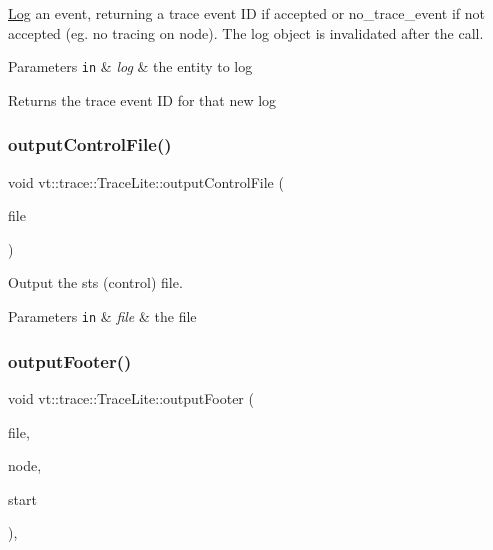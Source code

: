 \hyperlink{structvt_1_1trace_1_1_log}{Log} an event, returning a trace event ID if accepted or {\ttfamily no\+\_\+trace\+\_\+event} if not accepted (eg. no tracing on node). The log object is invalidated after the call. 


\begin{DoxyParams}[1]{Parameters}
\mbox{\tt in}  & {\em log} & the entity to log\\
\hline
\end{DoxyParams}
\begin{DoxyReturn}{Returns}
the trace event ID for that new log 
\end{DoxyReturn}
\mbox{\label{structvt_1_1trace_1_1_trace_lite_a7b60eedbf68a4989a1566f2cf85d94dd}} 
\subsubsection{\texorpdfstring{output\+Control\+File()}{outputControlFile()}}
{\footnotesize\ttfamily void vt\+::trace\+::\+Trace\+Lite\+::output\+Control\+File (\begin{DoxyParamCaption}\item[{std\+::ofstream \&}]{file }\end{DoxyParamCaption})\hspace{0.3cm}{\ttfamily [protected]}}



Output the sts (control) file. 


\begin{DoxyParams}[1]{Parameters}
\mbox{\tt in}  & {\em file} & the file \\
\hline
\end{DoxyParams}
\mbox{\label{structvt_1_1trace_1_1_trace_lite_a787596078778350020a4f601e91e793f}} 
\subsubsection{\texorpdfstring{output\+Footer()}{outputFooter()}}
{\footnotesize\ttfamily void vt\+::trace\+::\+Trace\+Lite\+::output\+Footer (\begin{DoxyParamCaption}\item[{\hyperlink{structvt_1_1trace_1_1vt__gz_file}{vt\+\_\+gz\+File} $\ast$}]{file,  }\item[{\hyperlink{namespacevt_a866da9d0efc19c0a1ce79e9e492f47e2}{Node\+Type} const}]{node,  }\item[{\hyperlink{namespacevt_a2b9f28078dc309ad0706b69ded743e69}{Time\+Type} const}]{start }\end{DoxyParamCaption})\hspace{0.3cm}{\ttfamily [static]}, {\ttfamily [protected]}}



